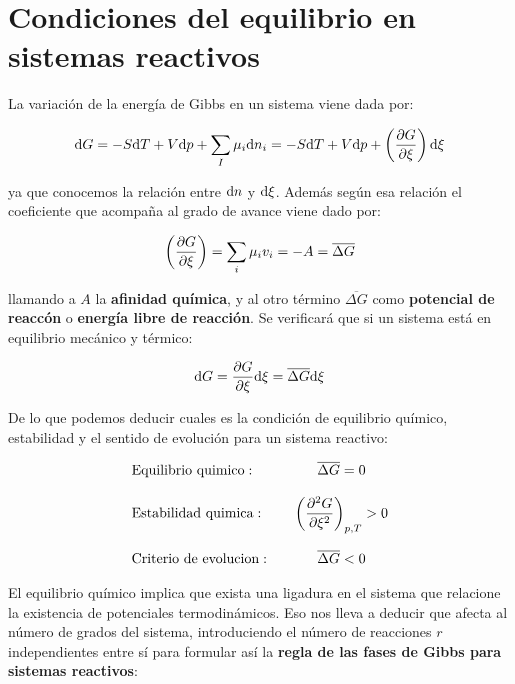 \documentclass[12pt]{book}
\begin{document}
\section{Condiciones del equilibrio en sistemas reactivos}

La variación de la energía de Gibbs en un sistema viene dada por:

\begin{equation}
\mathrm{d} G = - S \mathrm{d} T + V \mathrm{d} p + \sum_I \mu_i \mathrm{d} n_i = -S \mathrm{d} T + V \mathrm{d} p + \left( \dfrac{\partial G}{\partial \xi} \right) \mathrm{d} \xi
\end{equation}

ya que conocemos la relación entre $\mathrm{d} n$ y $\mathrm{d} \xi$. Además según esa relación el coeficiente que acompaña al grado de avance viene dado por:

\begin{equation}
\left( \dfrac{\partial G}{\partial \xi} \right) = \sum_i \mu_i v_i = -A = \overline{\Delta G} \label{ec:4.15}
\end{equation}

llamando a $A$ la \textbf{afinidad química}, y al otro término $\overline{\Delta G}$ como \textbf{potencial de reaccón} o \textbf{energía libre de reacción}. Se verificará que si un sistema está en equilibrio mecánico y térmico:

\begin{equation}
\mathrm{d} G = \frac{\partial G}{\partial \xi} \mathrm{d} \xi = \overline{\Delta G} \mathrm{d} \xi
\end{equation}

De lo que podemos deducir cuales es la condición de equilibrio químico, estabilidad y el sentido de evolución para un sistema reactivo:

\begin{equation}
\begin{array}{llc}
\mathrm{Equilibrio \ quimico:} & & \overline{\Delta G} = 0 \\ \\
\mathrm{Estabilidad \ quimica:} & &  \left( \dfrac{\partial^2 G }{\partial \xi ^2} \right)_{p,T} > 0   \\ \\
\mathrm{Criterio \ de \ evolucion:} & & \overline{\Delta G} < 0 
\end{array}
\end{equation}

El equilibrio químico implica que exista una ligadura en el sistema que relacione la existencia de potenciales termodinámicos. Eso nos lleva a deducir que afecta al número de grados del sistema, introduciendo el número de reacciones $r$ independientes entre sí para formular así la \textbf{regla de las fases de Gibbs para sistemas reactivos}:
\end{document}
